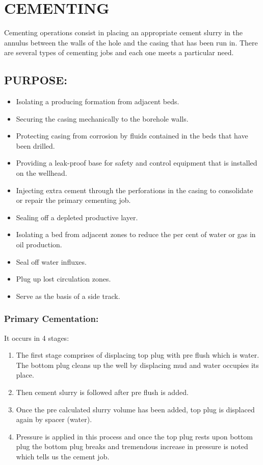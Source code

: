\chapter{CEMENTING}
	
\onehalfspacing	
	
Cementing operations consist in placing an appropriate cement slurry in 
the annulus between the walls of the hole and the casing that has been run in.
There are several types of cementing jobs and each one meets a particular need.


\section*{PURPOSE:}

\begin{itemize}

\item Isolating a producing formation from adjacent beds.  
\item Securing the casing mechanically to the borehole walls.
\item Protecting casing from corrosion by fluids contained in the beds that have been drilled.
\item Providing a leak-proof base for safety and control equipment that is installed on the wellhead.
\item Injecting extra cement through the perforations in the casing to consolidate or repair the primary cementing job.
\item Sealing off a depleted productive layer.
\item Isolating a bed from adjacent zones to reduce the per cent of water or gas in oil production.
\item Seal off water influxes.
\item Plug up lost circulation zones.
\item Serve as the basis of a side track.

\end{itemize}


\subsection*{Primary Cementation:}

It occurs in 4 stages:
\begin{enumerate}
\item The first stage comprises of displacing top plug with pre flush
which is water. The bottom plug cleans up the well by
displacing mud and water occupies its place.

\item Then cement slurry is followed after pre flush is added.

\item Once the pre calculated slurry volume has been added, top plug
is displaced again by spacer (water).

\item Pressure is applied in this process and once the top plug rests
upon bottom plug the bottom plug breaks and tremendous
increase in pressure is noted which tells us the cement job.
\end{enumerate}

